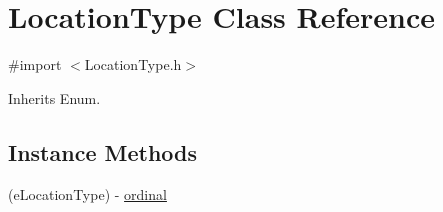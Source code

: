 \hypertarget{interface_location_type}{}\section{Location\+Type Class Reference}
\label{interface_location_type}


{\ttfamily \#import $<$Location\+Type.\+h$>$}



Inherits Enum.

\subsection*{Instance Methods}
\begin{DoxyCompactItemize}
\item 
(e\+Location\+Type) -\/ \hyperlink{interface_location_type_ab49cb2f7775e4eb317ae3d95537edef4}{ordinal}
\end{DoxyCompactItemize}
